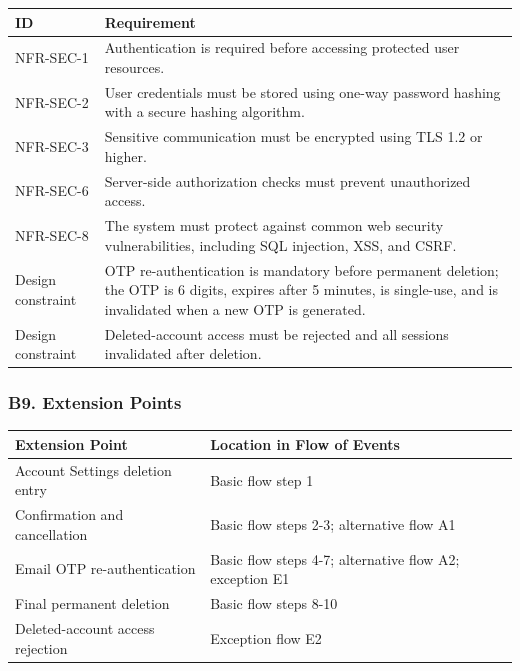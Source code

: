 \documentclass[12pt]{article}
\renewcommand{\baselinestretch}{1.5}
\begin{document}
\begingroup
\small
\renewcommand{\baselinestretch}{1.0}\selectfont
\renewcommand{\arraystretch}{1.15}
\setlength{\tabcolsep}{6pt}
\begin{longtable}{|>{\raggedright\arraybackslash}p{}|>{\raggedright\arraybackslash}p{}|}
\hline
\textbf{ID} & \textbf{Requirement} \\ \hline
\endhead
NFR-SEC-1 & Authentication is required before accessing protected user resources. \\ \hline
NFR-SEC-2 & User credentials must be stored using one-way password hashing with a secure hashing algorithm. \\ \hline
NFR-SEC-3 & Sensitive communication must be encrypted using TLS 1.2 or higher. \\ \hline
NFR-SEC-6 & Server-side authorization checks must prevent unauthorized access. \\ \hline
NFR-SEC-8 & The system must protect against common web security vulnerabilities, including SQL injection, XSS, and CSRF. \\ \hline
Design constraint & OTP re-authentication is mandatory before permanent deletion; the OTP is 6 digits, expires after 5 minutes, is single-use, and is invalidated when a new OTP is generated. \\ \hline
Design constraint & Deleted-account access must be rejected and all sessions invalidated after deletion. \\ \hline
\end{longtable}
\endgroup
\par\medskip

\hypertarget{sec:b9-extension-points}{}
\subsubsection*{B9. Extension Points}
\par\medskip

\begingroup
\small
\renewcommand{\baselinestretch}{1.0}\selectfont
\renewcommand{\arraystretch}{1.15}
\setlength{\tabcolsep}{6pt}
\begin{longtable}{|>{\raggedright\arraybackslash}p{}|>{\raggedright\arraybackslash}p{}|}
\hline
\textbf{Extension Point} & \textbf{Location in Flow of Events} \\ \hline
\endhead
Account Settings deletion entry & Basic flow step 1 \\ \hline
Confirmation and cancellation & Basic flow steps 2-3; alternative flow A1 \\ \hline
Email OTP re-authentication & Basic flow steps 4-7; alternative flow A2; exception E1 \\ \hline
Final permanent deletion & Basic flow steps 8-10 \\ \hline
Deleted-account access rejection & Exception flow E2 \\ \hline
\end{longtable}
\endgroup
\par\medskip
\end{document}
